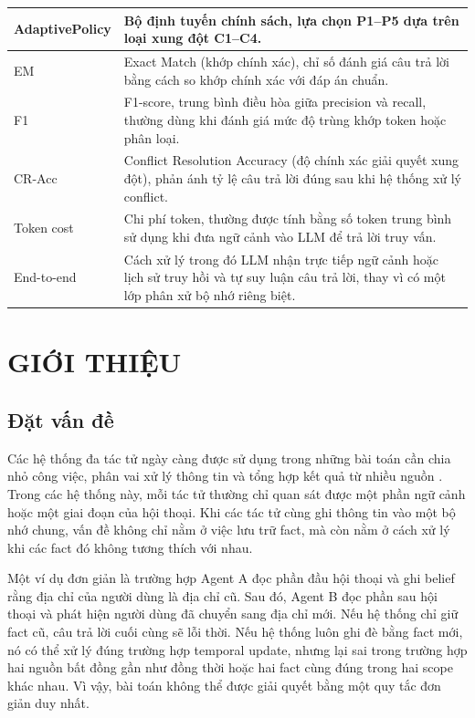 \documentclass[12pt,a4paper]{article}
\begin{document}
\begin{longtable}{|p{}|p{}|}
\hline
AdaptivePolicy & Bộ định tuyến chính sách, lựa chọn P1--P5 dựa trên loại xung đột C1--C4. \\
\hline
EM & Exact Match (khớp chính xác), chỉ số đánh giá câu trả lời bằng cách so khớp chính xác với đáp án chuẩn. \\
\hline
F1 & F1-score, trung bình điều hòa giữa precision và recall, thường dùng khi đánh giá mức độ trùng khớp token hoặc phân loại. \\
\hline
CR-Acc & Conflict Resolution Accuracy (độ chính xác giải quyết xung đột), phản ánh tỷ lệ câu trả lời đúng sau khi hệ thống xử lý conflict. \\
\hline
Token cost & Chi phí token, thường được tính bằng số token trung bình sử dụng khi đưa ngữ cảnh vào LLM để trả lời truy vấn. \\
\hline
End-to-end & Cách xử lý trong đó LLM nhận trực tiếp ngữ cảnh hoặc lịch sử truy hồi và tự suy luận câu trả lời, thay vì có một lớp phân xử bộ nhớ riêng biệt. \\
\hline
\end{longtable}

\renewcommand{\arraystretch}{1.0}
\newpage
\pagestyle{plain}

\section{GIỚI THIỆU}

\subsection{Đặt vấn đề}

Các hệ thống đa tác tử ngày càng được sử dụng trong những bài toán cần chia nhỏ công việc, phân vai xử lý thông tin và tổng hợp kết quả từ nhiều nguồn \cite{park2023generative,yao2023react}. Trong các hệ thống này, mỗi tác tử thường chỉ quan sát được một phần ngữ cảnh hoặc một giai đoạn của hội thoại. Khi các tác tử cùng ghi thông tin vào một bộ nhớ chung, vấn đề không chỉ nằm ở việc lưu trữ fact, mà còn nằm ở cách xử lý khi các fact đó không tương thích với nhau.

Một ví dụ đơn giản là trường hợp Agent A đọc phần đầu hội thoại và ghi belief rằng địa chỉ của người dùng là địa chỉ cũ. Sau đó, Agent B đọc phần sau hội thoại và phát hiện người dùng đã chuyển sang địa chỉ mới. Nếu hệ thống chỉ giữ fact cũ, câu trả lời cuối cùng sẽ lỗi thời. Nếu hệ thống luôn ghi đè bằng fact mới, nó có thể xử lý đúng trường hợp temporal update, nhưng lại sai trong trường hợp hai nguồn bất đồng gần như đồng thời hoặc hai fact cùng đúng trong hai scope khác nhau. Vì vậy, bài toán không thể được giải quyết bằng một quy tắc đơn giản duy nhất.
\end{document}
